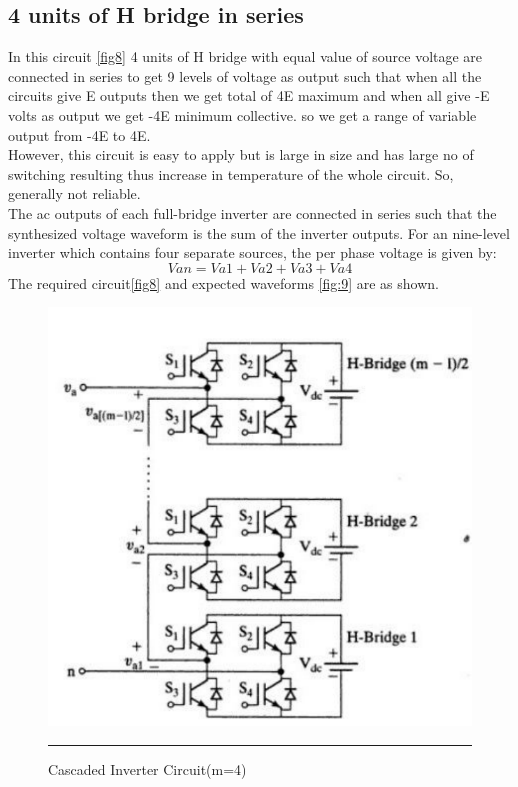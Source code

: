 \subsection{4 units of H bridge in series}
In this circuit \ref{fig8} 4 units of H bridge with equal value of source voltage are connected in series to get 9 levels of voltage as output such that when all the circuits give E outputs then we get total of 4E maximum and when all give -E volts as output we get -4E minimum collective. so we get a range of variable output from -4E to 4E.\\
However, this circuit is easy to apply but is large in size and has large no of switching resulting thus increase in temperature of the whole circuit. So, generally not reliable.\\
The ac outputs of each full-bridge inverter are connected in series such that the synthesized voltage waveform is the sum of the inverter outputs.
For an nine-level inverter which contains four separate sources, the per phase voltage is given by:
$$Van = Va1 + Va2 + Va3 + Va4 $$
The required circuit\ref{fig8} and expected waveforms \ref{fig:9} are as shown.\\
\begin{figure}[htbp]
	\centering
		\includegraphics[width = 5in]{./Figures/ninecircuit.pdf}
		\rule{35em}{5pt}
	\caption{Cascaded Inverter Circuit(m=4)}
	\label{fig7}
\end{figure}

